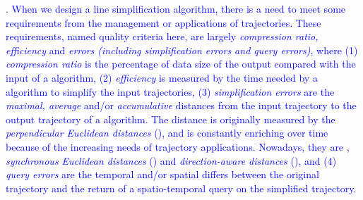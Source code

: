 . 
\textcolor{blue}{When we design a line simplification algorithm, there is a need to meet some requirements from the management or applications of trajectories. These requirements, named quality criteria here, are largely \emph{compression ratio, efficiency} and \emph{errors (including simplification errors and query errors)}, where 
(1) \emph{compression ratio} is the percentage of data size of the output compared with the input of a \lsa algorithm, 
(2) \emph{efficiency} is measured by the time needed by a \lsa algorithm to simplify the input trajectories,
(3) \emph{simplification errors} are the \emph{maximal, average} and/or \emph{accumulative} distances from the input trajectory to the output trajectory of a \lsa algorithm. The distance is originally measured by the \emph{perpendicular Euclidean distances} (\ped), and is constantly enriching over time because of the increasing needs of trajectory applications. Nowadays, they are \ped, \emph{synchronous Euclidean distances} (\sed) and \emph{direction-aware distances} (\dad), and}
\textcolor{blue}{(4) \emph{query errors} are the temporal and/or spatial differs between the original trajectory and the return of a spatio-temporal query \cite{Meratnia:Spatiotemporal, Lin:Cised} on the simplified trajectory.}





